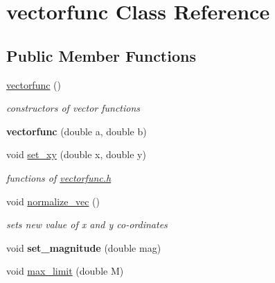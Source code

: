 \hypertarget{classvectorfunc}{}\section{vectorfunc Class Reference}
\label{classvectorfunc}
\subsection*{Public Member Functions}
\begin{DoxyCompactItemize}
\item 
\mbox{\label{classvectorfunc_a796cc09e267289f8dcf555d8a35c9264}} 
\mbox{\hyperlink{classvectorfunc_a796cc09e267289f8dcf555d8a35c9264}{vectorfunc}} ()
\begin{DoxyCompactList}\small\item\em constructors of vector functions \end{DoxyCompactList}\item 
\mbox{\label{classvectorfunc_aec15f6d5498b17fb987ffb420d3c731f}} 
{\bfseries vectorfunc} (double a, double b)
\item 
\mbox{\label{classvectorfunc_a821fae9fc69b83e5b6ba044688f26ebe}} 
void \mbox{\hyperlink{classvectorfunc_a821fae9fc69b83e5b6ba044688f26ebe}{set\+\_\+xy}} (double x, double y)
\begin{DoxyCompactList}\small\item\em functions of \mbox{\hyperlink{vectorfunc_8h_source}{vectorfunc.\+h}} \end{DoxyCompactList}\item 
void \mbox{\hyperlink{classvectorfunc_a19ef4028d6623c18366fdebd0ef37eac}{normalize\+\_\+vec}} ()
\begin{DoxyCompactList}\small\item\em sets new value of x and y co-\/ordinates \end{DoxyCompactList}\item 
\mbox{\label{classvectorfunc_a03359cc0387f9125ab041b9a99407f7c}} 
void {\bfseries set\+\_\+magnitude} (double mag)
\item 
\mbox{\label{classvectorfunc_aaabdc9d587f11992f78fff088d471162}} 
void \mbox{\hyperlink{classvectorfunc_aaabdc9d587f11992f78fff088d471162}{max\+\_\+limit}} (double M)

\end{DoxyCompactItemize}
